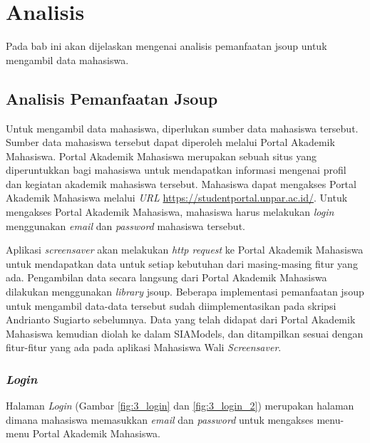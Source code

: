 \chapter{Analisis}
\label{chap:analisis}

Pada bab ini akan dijelaskan mengenai analisis pemanfaatan jsoup untuk mengambil data mahasiswa.

\section{Analisis Pemanfaatan Jsoup}
Untuk mengambil data mahasiswa, diperlukan sumber data mahasiswa tersebut. Sumber data mahasiswa tersebut dapat diperoleh melalui Portal Akademik Mahasiswa. Portal Akademik Mahasiswa merupakan sebuah situs yang diperuntukkan bagi mahasiswa untuk mendapatkan informasi mengenai profil dan kegiatan akademik mahasiswa tersebut. Mahasiswa dapat mengakses Portal Akademik Mahasiswa melalui \textit{URL} \url{https://studentportal.unpar.ac.id/}. Untuk mengakses Portal Akademik Mahasiswa, mahasiswa harus melakukan \textit{login} menggunakan \textit{email} dan \textit{password} mahasiswa tersebut.

Aplikasi \textit{screensaver} akan melakukan \textit{http request} ke Portal Akademik Mahasiswa untuk mendapatkan data untuk setiap kebutuhan dari masing-masing fitur yang ada. Pengambilan data secara langsung dari Portal Akademik Mahasiswa dilakukan menggunakan \textit{library} jsoup. Beberapa implementasi pemanfaatan jsoup untuk mengambil data-data tersebut sudah diimplementasikan pada skripsi Andrianto Sugiarto \cite{ifstupor} sebelumnya. Data yang telah didapat dari Portal Akademik Mahasiswa kemudian diolah ke dalam SIAModels, dan ditampilkan sesuai dengan fitur-fitur yang ada pada aplikasi Mahasiswa Wali \textit{Screensaver}.

\subsection{\textit{Login}}
Halaman \textit{Login} (Gambar \ref{fig:3_login} dan \ref{fig:3_login_2}) merupakan halaman dimana mahasiswa memasukkan \textit{email} dan \textit{password} untuk mengakses menu-menu Portal Akademik Mahasiswa.

